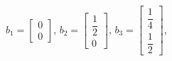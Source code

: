 \documentclass[preview]{standalone}
\begin{document}
\begin{center}
$b_1=\begin{bmatrix}0\\[10pt]0\end{bmatrix}$, $b_2=\begin{bmatrix}\dfrac{1}{2}\\[10pt]0\end{bmatrix}$, $b_3=\begin{bmatrix}\dfrac{1}{4}\\[10pt]\dfrac{1}{2}\end{bmatrix}$,
\end{center}
\end{document}
